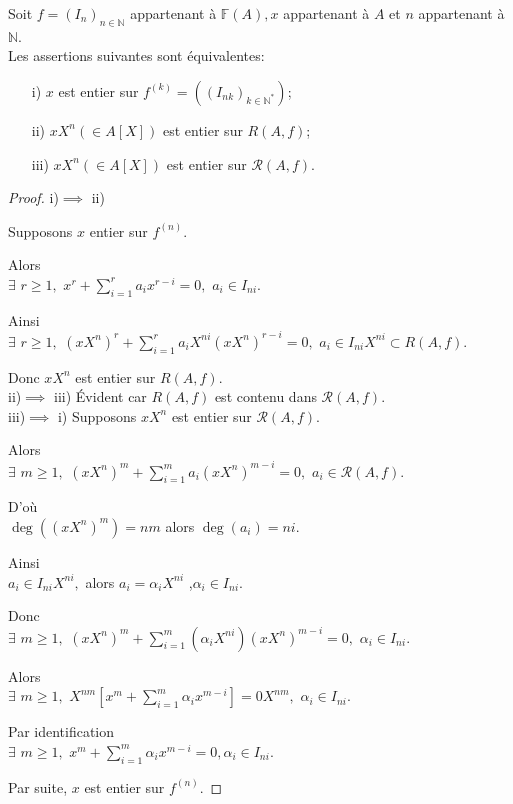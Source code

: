\begin{maproposition}
	\label{maprop1}
	Soit $f=(I_n)_{n \in \mathbb{N}} $ appartenant à $ \mathbb{F}(A), x $ appartenant à $ A $ et $n $ appartenant à $ \mathbb{N}$.\\
	Les assertions suivantes sont équivalentes: 
	\begin{enumerate}
		\item[i)] $x$ est entier sur $f^{(k)}=((I_{nk})_{k \in \mathbb{N}^*})$;
		\item[ii)] $xX^n(\in A[X])$ est entier sur $R(A,f)$;
		\item[iii)] $xX^n(\in A[X])$ est entier sur $ \mathcal{R}(A,f)$.
	\end{enumerate}
	\begin{proof}
		i)$\implies$ ii)
		
		Supposons $x$ entier sur $f^{(n)}$.
		
		Alors \\ 
		$\exists$  $r\geq 1,$ $x^{r}+\sum\limits_{i=1}^{r}a_{i}x^{r-i}=0,$ $a_{i}\in I_{ni}$.
		
		Ainsi \\
		$\exists$  $r\geq 1,$ $(xX^{n})^{r}+\sum
		\limits_{i=1}^{r}a_{i}X^{ni}(xX^{n})^{r-i}=0,$ $a_{i}\in I_{ni} X^{ni} \subset R(A,f)$.
		
		Donc $xX^{n}$ est entier sur $R(A,f).$ \\
		
		ii)$\implies$ iii) Évident car $R(A,f)$ est contenu dans $  \mathcal{R}(A,f).$ \\
		iii)$\implies$ i) Supposons $xX^{n}$ est entier sur $\mathcal{R}(A,f).$
		
		Alors \\ $\exists$  $m\geq 1,$ $(xX^{n})^{m}+\sum\limits_{i=1}^{m}a_{i}(xX^{n})^{m-i}=0,$ $a_{i}\in \mathcal{R}(A,f)$.
		
		D'où \\ $\deg ((xX^{n})^{m})=nm$ alors $\deg (a_{i})=ni.$
		
		Ainsi \\ $a_{i}\in I_{ni}X^{ni},$ alors $a_{i}=\alpha _{i}X^{ni}$ ,$\alpha _{i}\in I_{ni}$.
		
		Donc \\ $\exists$  $m\geq 1,$ $(xX^{n})^{m}+\sum\limits_{i=1}^{m}(\alpha
		_{i}X^{ni})(xX^{n})^{m-i}=0,$ $\alpha _{i}\in I_{ni}$.
		
		Alors\\ $\exists$  $m\geq 1,$ $X^{nm}[x^{m}+\sum\limits_{i=1}^{m}\alpha
		_{i}x^{m-i}]=0X^{nm},$ $\alpha _{i}\in I_{ni}$.
		
		Par identification\\ $\exists$  $m\geq 1,$ $ x^{m}+\sum\limits_{i=1}^{m}\alpha _{i}x^{m-i}=0,\alpha _{i}\in I_{ni}$.
		
		Par suite, $x$ est entier sur $f^{(n)}$.
	\end{proof}
\end{maproposition}

